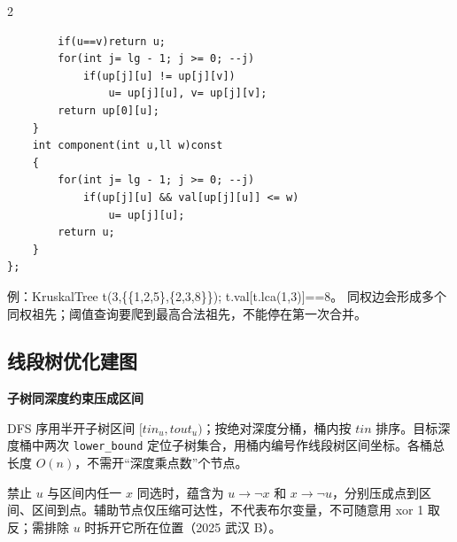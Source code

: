 \documentclass[UTF8,fontset=fandol,a4paper,twoside]{ctexart}
\newcommand{\topic}[1]{\par\smallskip\textbf{#1}\par\nobreak}
\newcommand{\note}[1]{{\fontsize{10}{12}\selectfont #1\par}}
\begin{document}
\begin{multicols}{2}
\begin{lstlisting}
        if(u==v)return u;
        for(int j= lg - 1; j >= 0; --j)
            if(up[j][u] != up[j][v])
                u= up[j][u], v= up[j][v];
        return up[0][u];
    }
    int component(int u,ll w)const
    {
        for(int j= lg - 1; j >= 0; --j)
            if(up[j][u] && val[up[j][u]] <= w)
                u= up[j][u];
        return u;
    }
};
\end{lstlisting}
\note{例：KruskalTree t(\allowbreak{}3,\allowbreak{}\{\{1,\allowbreak{}2,\allowbreak{}5\},\allowbreak{}\{2,\allowbreak{}3,\allowbreak{}8\}\})\allowbreak{}; t.\allowbreak{}val[\allowbreak{}t.\allowbreak{}lca(\allowbreak{}1,\allowbreak{}3)\allowbreak{}]\allowbreak{}=\allowbreak{}=\allowbreak{}8。 同权边会形成多个同权祖先；阈值查询要爬到最高合法祖先，不能停在第一次合并。}
\subsection{线段树优化建图}

\topic{子树同深度约束压成区间}
\note{DFS 序用半开子树区间 $[tin_u,tout_u)$；按绝对深度分桶，桶内按 $tin$ 排序。目标深度桶中两次 \texttt{lower\_bound} 定位子树集合，用桶内编号作线段树区间坐标。各桶总长度 $O(n)$，不需开“深度乘点数”个节点。}
\note{禁止 $u$ 与区间内任一 $x$ 同选时，蕴含为 $u\to\neg x$ 和 $x\to\neg u$，分别压成点到区间、区间到点。辅助节点仅压缩可达性，不代表布尔变量，不可随意用 xor 1 取反；需排除 $u$ 时拆开它所在位置（2025 武汉 B）。}


\end{multicols}
\end{document}
